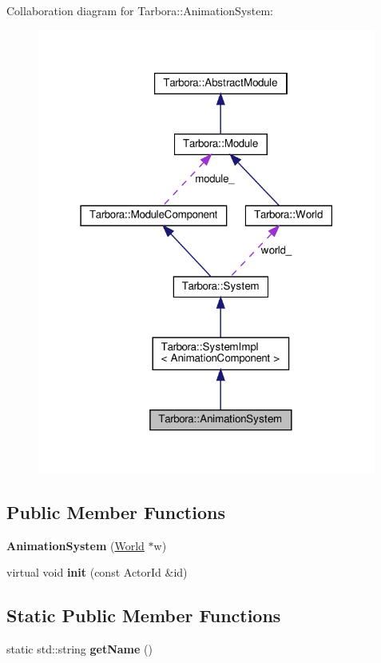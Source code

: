 Collaboration diagram for Tarbora\+:\+:Animation\+System\+:\nopagebreak
\begin{figure}[H]
\begin{center}
\leavevmode
\includegraphics[width=316pt]{classTarbora_1_1AnimationSystem__coll__graph}
\end{center}
\end{figure}
\subsection*{Public Member Functions}
\begin{DoxyCompactItemize}
\item 
\mbox{\label{classTarbora_1_1AnimationSystem_a15c1e060a4dffe2fae17adb2b1984500}} 
{\bfseries Animation\+System} (\hyperlink{classTarbora_1_1World}{World} $\ast$w)
\item 
\mbox{\label{classTarbora_1_1AnimationSystem_a883d0cc7a780db4b7713b6c64fb50e13}} 
virtual void {\bfseries init} (const Actor\+Id \&id)
\end{DoxyCompactItemize}
\subsection*{Static Public Member Functions}
\begin{DoxyCompactItemize}
\item 
\mbox{\label{classTarbora_1_1AnimationSystem_af789b917c68f8b9d5b74ede0eeaae381}} 
static std\+::string {\bfseries get\+Name} ()
\end{DoxyCompactItemize}
